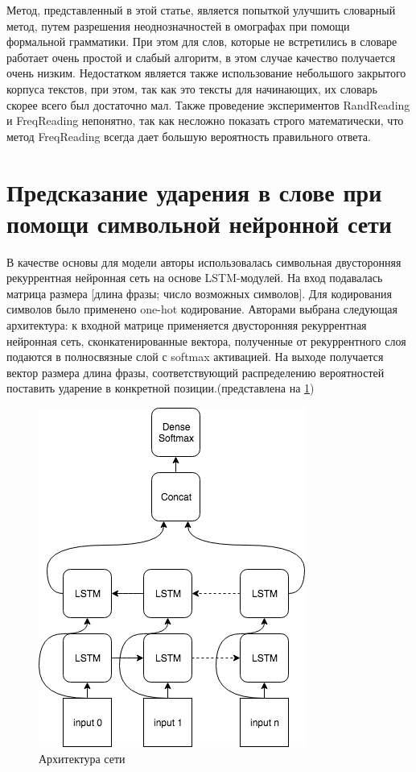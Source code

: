 \documentclass[14pt, a4paper, russian]{report}
\begin{document}
\begin{normalsize}
Метод, представленный в этой статье, является попыткой улучшить словарный метод, путем разрешения неоднозначностей в омографах при помощи формальной грамматики. При этом для слов, которые не  встретились в словаре работает очень простой и слабый алгоритм, в этом случае качество получается очень низким. Недостатком является также использование небольшого закрытого корпуса текстов, при этом, так как это тексты для начинающих, их словарь скорее всего был достаточно мал. Также проведение экспериментов RandReading и FreqReading непонятно, так как несложно показать строго математически, что метод FreqReading всегда дает большую вероятность правильного ответа.

\section{Предсказание ударения в слове при помощи символьной нейронной сети}
	В качестве основы для модели авторы\cite{ponomareva} использовалась  символьная двусторонняя рекуррентная нейронная сеть на основе LSTM-модулей. На вход подавалась матрица размера [длина фразы; число возможных символов]. Для кодирования символов было применено one-hot кодирование. Авторами выбрана следующая архитектура: к входной матрице применяется двусторонняя рекуррентная нейронная сеть, сконкатенированные вектора, полученные от рекуррентного слоя подаются в полносвязные слой с softmax активацией. На выходе получается вектор размера длина фразы, соответствующий распределению вероятностей поставить ударение в конкретной позиции.(представлена на \cref{fig:base_global})

\begin{figure}[H]
	\begin{center}
		\includegraphics[width=0.5\linewidth]{Baseline}
	\end{center}
	\caption{\small{Архитектура сети}}
	\label{fig:base_global}
\end{figure}


\end{normalsize}
\end{document}

